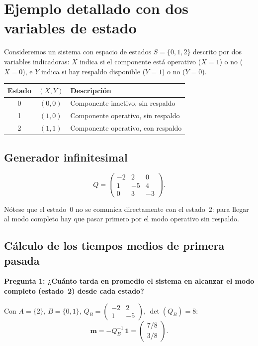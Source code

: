 \documentclass[11pt, letterpaper]{article}
\begin{document}
\section{Ejemplo detallado con dos variables de estado}

Consideremos un sistema con espacio de estados $S=\{0,1,2\}$ descrito
por dos variables indicadoras: $X$ indica si el componente está
operativo ($X=1$) o no ($X=0$), e $Y$ indica si hay respaldo
disponible ($Y=1$) o no ($Y=0$).

\begin{center}
\begin{tabular}{ccl}
  \toprule
  \textbf{Estado} & $(X,Y)$ & \textbf{Descripción}\\
  \midrule
  0 & $(0,0)$ & Componente inactivo, sin respaldo\\
  1 & $(1,0)$ & Componente operativo, sin respaldo\\
  2 & $(1,1)$ & Componente operativo, con respaldo\\
  \bottomrule
\end{tabular}
\end{center}

\subsection{Generador infinitesimal}

\[
  Q = \begin{pmatrix}
    -2 &  2 &  0 \\
     1 & -5 &  4 \\
     0 &  3 & -3
  \end{pmatrix}.
\]

Nótese que el estado~$0$ no se comunica directamente con el
estado~$2$: para llegar al modo completo hay que pasar primero por el
modo operativo sin respaldo.

\subsection{Cálculo de los tiempos medios de primera pasada}

\textbf{Pregunta 1: ¿Cuánto tarda en promedio el sistema en alcanzar
el modo completo (estado~2) desde cada estado?}

Con $A=\{2\}$, $B=\{0,1\}$, $Q_B = \begin{pmatrix} -2 & 2 \\ 1 & -5 \end{pmatrix}$,
$\det(Q_B)=8$:
\[
  \mathbf{m} = -Q_B^{-1}\,\mathbf{1}
  = \begin{pmatrix} 7/8 \\ 3/8 \end{pmatrix}.
\]
\end{document}
